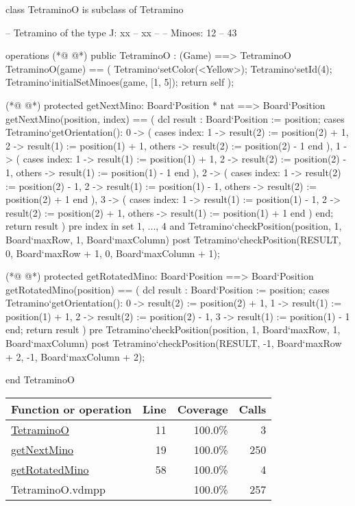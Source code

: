 \begin{vdmpp}[breaklines=true]
class TetraminoO is subclass of Tetramino
  
 -- Tetramino of the type J: xx
 --         xx
 --  
 -- Minoes:       12
 --         43
 

 operations
(*@
\label{TetraminoO:11}
@*)
  public TetraminoO : (Game) ==> TetraminoO
  TetraminoO(game) == (
   Tetramino`setColor(<Yellow>);
   Tetramino`setId(4);
   Tetramino`initialSetMinoes(game, [1, 5]);
   return self
  );

(*@
\label{getNextMino:19}
@*)
  protected getNextMino: Board`Position * nat ==> Board`Position
  getNextMino(position, index) == (
   dcl result : Board`Position := position;
   cases Tetramino`getOrientation():
    0 -> (
     cases index:
      1 -> result(2) := position(2) + 1,
      2 -> result(1) := position(1) + 1,
      others -> result(2) := position(2) - 1
     end
    ),
    1 -> (
     cases index:
      1 -> result(1) := position(1) + 1,
      2 -> result(2) := position(2) - 1,
      others -> result(1) := position(1) - 1
     end
    ),
    2 -> (
     cases index:
      1 -> result(2) := position(2) - 1,
      2 -> result(1) := position(1) - 1,
      others -> result(2) := position(2) + 1
     end
    ),
    3 -> (
     cases index:
      1 -> result(1) := position(1) - 1,
      2 -> result(2) := position(2) + 1,
      others -> result(1) := position(1) + 1
     end
    )
   end;
   return result
  )
  pre index in set {1, ..., 4} 
   and Tetramino`checkPosition(position, 1, Board`maxRow, 1, Board`maxColumn)
  post Tetramino`checkPosition(RESULT, 0, Board`maxRow + 1, 0, Board`maxColumn + 1);
   
(*@
\label{getRotatedMino:58}
@*)
  protected getRotatedMino: Board`Position ==> Board`Position
  getRotatedMino(position) == (
   dcl result : Board`Position := position;
   cases Tetramino`getOrientation():
    0 -> result(2) := position(2) + 1,
    1 -> result(1) := position(1) + 1,
    2 -> result(2) := position(2) - 1,
    3 -> result(1) := position(1) - 1
   end;
   return result
  )
  pre Tetramino`checkPosition(position, 1, Board`maxRow, 1, Board`maxColumn)
  post Tetramino`checkPosition(RESULT, -1, Board`maxRow + 2, -1, Board`maxColumn + 2);

end TetraminoO
\end{vdmpp}
\bigskip
\begin{longtable}{|l|r|r|r|}
\hline
Function or operation & Line & Coverage & Calls \\
\hline
\hline
\hyperref[TetraminoO:11]{TetraminoO} & 11&100.0\% & 3 \\
\hline
\hyperref[getNextMino:19]{getNextMino} & 19&100.0\% & 250 \\
\hline
\hyperref[getRotatedMino:58]{getRotatedMino} & 58&100.0\% & 4 \\
\hline
\hline
TetraminoO.vdmpp & & 100.0\% & 257 \\
\hline
\end{longtable}

